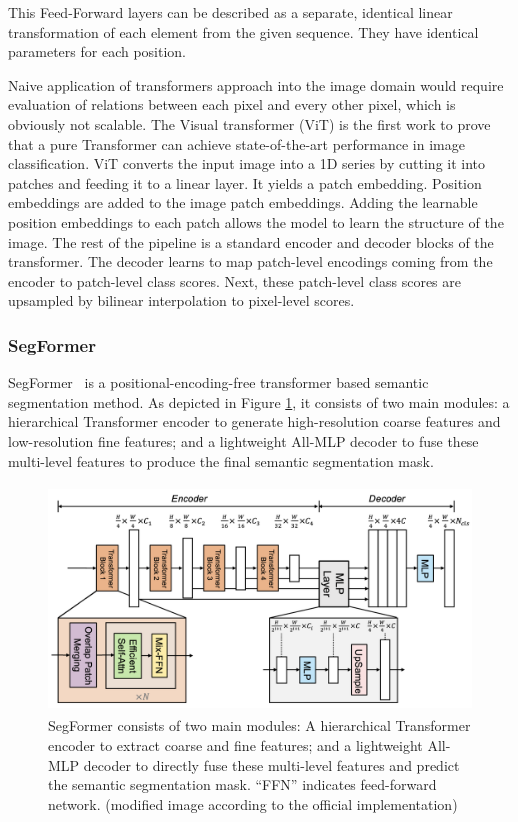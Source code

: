 This Feed-Forward layers can be described as a separate, identical linear transformation of each element from the given sequence. They have identical parameters for each position.

Naive application of transformers approach into the image domain would require evaluation of relations between each pixel and every other pixel, which is obviously not scalable. The Visual transformer (ViT) \cite{dosovitskiy2020image} is the first work to prove that a pure Transformer can achieve state-of-the-art performance in image classification. ViT converts the input image into a 1D series by cutting it into patches and feeding it to a linear layer. It yields a patch embedding. Position embeddings are added to the image patch embeddings. Adding the learnable position embeddings to each patch allows the model to learn the structure of the image. The rest of the pipeline is a standard encoder and decoder blocks of the transformer.  The decoder learns to map patch-level encodings coming from the encoder to patch-level class scores. Next, these patch-level class scores are upsampled by bilinear interpolation to pixel-level scores.

\subsubsection{SegFormer}
SegFormer~\cite{xie2021segformer} is a positional-encoding-free transformer based semantic segmentation method. As depicted in Figure \ref{fig:segformer_over}, it consists of two main modules: a hierarchical Transformer encoder to generate high-resolution coarse features and low-resolution fine features; and a lightweight All-MLP decoder to fuse these multi-level features to produce the final semantic segmentation mask. 

\begin{figure}[h] %
    \centering
    \includegraphics[height=60mm]{figures/03_segformer_overview.png} %
    \caption{SegFormer consists of two main modules: A hierarchical Transformer encoder to extract coarse and fine features; and a lightweight All-MLP decoder to directly fuse these multi-level features and predict the semantic segmentation mask. “FFN” indicates feed-forward network. (modified image \cite{xie2021segformer} according to the official implementation)} %
    \label{fig:segformer_over} %
\end{figure} 

